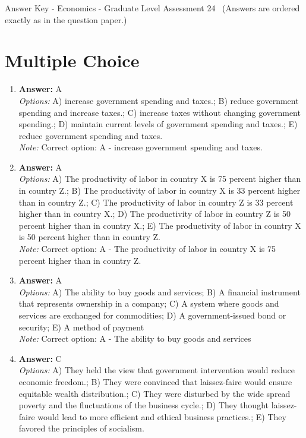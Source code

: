 \documentclass[12pt]{article}
\begin{document}
\begin{center}
Answer Key - Economics - Graduate Level Assessment 24 \
\small (Answers are ordered exactly as in the question paper.)
\end{center}

\section*{Multiple Choice}
\begin{enumerate}[label=\arabic*.]
\item \textbf{Answer:} A
\\ \textit{Options:} A) increase government spending and taxes.; B) reduce government spending and increase taxes.; C) increase taxes without changing government spending.; D) maintain current levels of government spending and taxes.; E) reduce government spending and taxes.
\\ \textit{Note:} Correct option: A - increase government spending and taxes.
\item \textbf{Answer:} A
\\ \textit{Options:} A) The productivity of labor in country X is 75 percent higher than in country Z.; B) The productivity of labor in country X is 33 percent higher than in country Z.; C) The productivity of labor in country Z is 33 percent higher than in country X.; D) The productivity of labor in country Z is 50 percent higher than in country X.; E) The productivity of labor in country X is 50 percent higher than in country Z.
\\ \textit{Note:} Correct option: A - The productivity of labor in country X is 75 percent higher than in country Z.
\item \textbf{Answer:} A
\\ \textit{Options:} A) The ability to buy goods and services; B) A financial instrument that represents ownership in a company; C) A system where goods and services are exchanged for commodities; D) A government-issued bond or security; E) A method of payment
\\ \textit{Note:} Correct option: A - The ability to buy goods and services
\item \textbf{Answer:} C
\\ \textit{Options:} A) They held the view that government intervention would reduce economic freedom.; B) They were convinced that laissez-faire would ensure equitable wealth distribution.; C) They were disturbed by the wide spread poverty and the fluctuations of the business cycle.; D) They thought laissez-faire would lead to more efficient and ethical business practices.; E) They favored the principles of socialism.

\end{enumerate}
\end{document}
